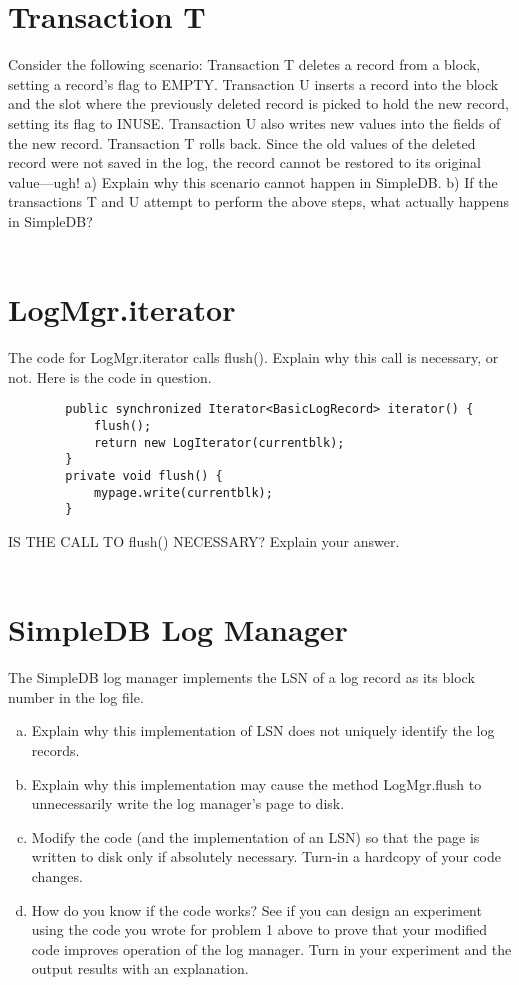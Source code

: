 \documentclass [letterpaper,12pt] {article}
\begin{document}
\section{Transaction T}
    Consider the following scenario: Transaction T deletes a record from a
    block, setting a record’s flag to EMPTY. Transaction U inserts a 
    record into the block and the slot where the previously deleted 
    record is picked to hold the new record, setting its flag to INUSE. 
    Transaction U also writes new values into the fields of the new record. 
    Transaction T rolls back. Since the old values of the deleted record 
    were not saved in the log, the record cannot be restored to its original 
    value—ugh! a) Explain why this scenario cannot happen in SimpleDB. 
    b) If the transactions T and U attempt to perform the above steps, what 
    actually happens in SimpleDB?
    \\
    \\

\section{LogMgr.iterator}
    The code for LogMgr.iterator calls flush(). Explain why this call is 
    necessary, or not. Here is the code in question.

    \begin{verbatim}
        public synchronized Iterator<BasicLogRecord> iterator() {
            flush();
            return new LogIterator(currentblk);
        }
        private void flush() {
            mypage.write(currentblk);
        }
    \end{verbatim}
    IS THE CALL TO flush() NECESSARY? Explain your answer.
    \\
    \\

\section{SimpleDB Log Manager}
    The SimpleDB log manager implements the LSN of a log record as its 
    block number in the log file.

    \begin{enumerate}[(a)]
        \item Explain why this implementation of LSN does not uniquely
            identify the log records.
        \item Explain why this implementation may cause the method 
            LogMgr.flush to unnecessarily write the log manager’s page 
            to disk.
        \item Modify the code (and the implementation of an LSN) so that
            the page is written to disk only if absolutely necessary. 
            Turn-in a hardcopy of your code changes.
        \item How do you know if the code works? See if you can design 
            an experiment using the code you wrote for problem 1 above
            to prove that your modified code improves operation of the 
            log manager. Turn in your experiment and the output results 
            with an explanation.
    \end{enumerate}
\end{document}
